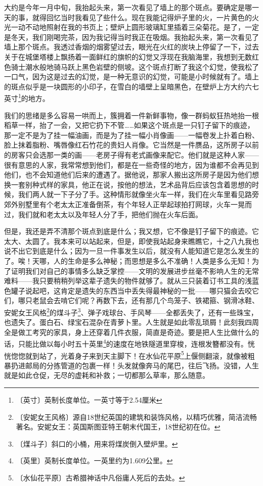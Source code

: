 \documentclass[12pt,UTF-8,openany]{ctexbook}
\begin{document}
\begin{normalsize}
    
    大约是今年一月中旬，我抬起头来，第一次看见了墙上的那个斑点。要确定是哪一天的事，就得回忆当时我看见了些什么。现在我能记得炉子里的火，一片黄色的火光一动不动地照射在我的书页上；壁炉上圆形玻璃缸里插着三朵菊花。是了，一定是冬天，我们刚喝完茶，因为我记得当时我正在吸烟。我抬起头来，第一次看见了墙上那个斑点。我透过香烟的烟雾望过去，眼光在火红的炭块上停留了一下，过去关于在城堡塔楼上飘扬着一面鲜红的旗帜的幻觉又浮现在我脑海里，我想到无数红色骑士潮水般地骑马跃上黑色岩壁的侧坡。这个斑点打断了我这个幻觉，使我松了一口气，因为这是过去的幻觉，是一种无意识的幻觉，可能是小时候就有了。墙上的斑点似乎是一块圆形的小印子，在雪白的墙壁上呈暗黑色，在壁炉上方大约六七英寸\footnote{〔英寸〕英制长度单位。一英寸等于2.54厘米}的地方。
    
    我们的思绪是多么容易一哄而上，簇拥着一件新鲜事物，像一群蚂蚁狂热地抬一根稻草一样，抬了一会，又把它扔下不管……如果这个斑点是一只钉子留下的痕迹，那一定不是为了挂一幅油画，而是为了挂一幅小肖像画——一幅卷发上扑着白粉、脸上抹着脂粉、嘴唇像红石竹花的贵妇人肖像。它当然是一件赝品，这所房子以前的房客只会选那一类的画——老房子得有老式画像来配它。他们就是这种人家——很有意思的人家，我常常想到他们，都是在一些奇怪的地方，因为谁都不会再见到他们，也不会知道他们后来的遭遇了。据他说，那家人搬出这所房子是因为他们想换一套别种式样的家具，他正在说，按他的想法，艺术品背后应该包含着思想的时候，我们两人就一下子分了手。这种情形就像坐火车一样，我们在火车里看见路旁郊外别墅里有个老太太正准备倒茶，有个年轻人正举起球拍打网球，火车一晃而过，我们就和老太太以及年轻人分了手，把他们抛在火车后面。
    
    但是，我还是弄不清那个斑点到底是什么；我又想，它不像是钉子留下的痕迹。它太大、太圆了。我本来可以站起来，但是，即使我站起身来瞧瞧它，十之八九我也说不出它到底是什么；因为一旦一件事发生以后，就没有人能知道它是怎么发生的了。唉！天哪，人的生命是多么神秘；而思想是多么不准确！人类是多么无知！为了证明我们对自己的事情多么缺乏掌控——文明的发展进步丝毫不影响人生的无常难料——我只要稍稍列举这辈子遗失的物件就够了。就从三只装着订书工具的浅蓝色罐子说起吧，这肯定是遗失的东西当中丢失得最神秘的一批——哪只猫会去咬它们，哪只老鼠会去啃它们呢？再数下去，还有那几个鸟笼子、铁裙箍、钢滑冰鞋、安妮女王风格\footnote{〔安妮女王风格〕源自18世纪英国的建筑和装饰风格，以精巧优雅，简洁流畅著名。安妮女王：英国斯图亚特王朝末代国王，18世纪初在位。}的煤斗子\footnote{〔煤斗子〕斜口的小桶，用来将煤炭倒入壁炉里。}、弹子戏球台、手风琴——全都丢失了，还有一些珠宝，也遗失了。蛋白石、绿宝石混杂在青萝卜里。人生就是如此零乱琐屑！此刻我四周全是做工考究的家具，身上还穿着几件衣服，简直是奇迹。要是把人生比做什么的话，只能比做以每小时五十英里\footnote{〔英里〕英制长度单位。一英里约为1.609公里。}的速度在地铁隧道里穿梭，连根发簪都没有。恍恍惚惚就到站了，光着身子来到天主脚下！在水仙花平原\footnote{〔水仙花平原〕古希腊神话中凡俗庸人死后的去处。}上偃侧翻滚，就像被粗暴扔进邮局的分拣管道的包裹一样！头发就像奔马的尾巴，往后飞扬。没错，人生就是如此仓促，无尽的虚耗和补救；一切都那么草率，那么随意。
    

\end{normalsize}
\end{document}
